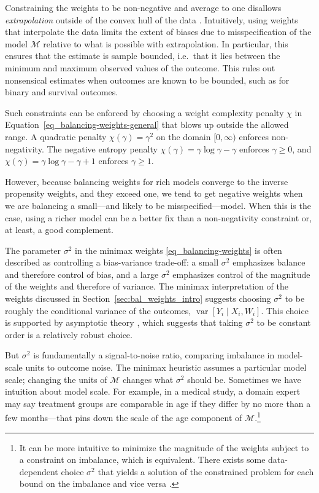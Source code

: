 \documentclass{article}
\theoremstyle{definition}
\DeclareMathOperator{\Var}{var}
\newcommand{\dispersion}{\chi}
\newcommand{\model}{\mathcal{M}}
\newcommand{\<}{\langle}
\renewcommand{\>}{\rangle}
\begin{document}
Constraining the weights to be non-negative and average to one disallows \emph{extrapolation} outside of the convex hull of the data \citep{hirshberg2025bregman}. Intuitively, using weights that interpolate the data limits the extent of biases due to misspecification of the model $\mathcal{M}$ relative to what is possible with extrapolation. In particular, this ensures that the estimate is sample bounded, i.e.\ that it lies between the minimum and maximum observed values of the outcome.
This rules out nonsensical estimates when outcomes are known to be bounded, such as for binary and survival outcomes.

Such constraints can be enforced by choosing a weight complexity penalty $\dispersion$ in Equation~\ref{eq_balancing-weights-general} that blows up outside the allowed range. A quadratic penalty $\dispersion(\gamma) = \gamma^2$ on the domain $[0, \infty)$ enforces non-negativity. The negative entropy penalty $\dispersion(\gamma) = \gamma \log \gamma - \gamma$ enforces $\gamma \ge 0$, and $\dispersion(\gamma) = \gamma \log \gamma - \gamma + 1$ enforces $\gamma \ge 1$.

However, because balancing weights for rich models converge to the inverse propensity weights, and they exceed one, we tend to get negative weights when we are balancing a small---and likely to be misspecified---model.
When this is the case, using a richer model can be a better fix than a non-negativity constraint or, at least, a good complement.

The parameter $\sigma^2$ in the minimax weights \eqref{eq_balancing-weights} is often described as controlling a bias-variance trade-off: a small $\sigma^2$ emphasizes balance and therefore control of bias, and a large $\sigma^2$ emphasizes control of the magnitude of the weights and therefore of variance. The minimax interpretation of the weights discussed in Section~\ref{sec:bal_weights_intro} suggests choosing $\sigma^2$ to be roughly the conditional variance of the outcomes, $\Var[Y_i \mid X_i, W_i]$. This choice is supported by asymptotic theory \citep[e.g.,][]{hirshberg2021augmented, hirshberg2019minimax}, which suggests that taking $\sigma^2$ to be constant order is a relatively robust choice.

But $\sigma^2$ is fundamentally a signal-to-noise ratio, comparing imbalance in model-scale units to outcome noise. The minimax heuristic assumes a particular model scale; changing the units of $\model$ changes what $\sigma^2$ should be. Sometimes we have intuition about model scale. For example, in a medical study, a domain expert may say treatment groups are comparable in age if they differ by no more than a few months---that pins down the scale of the age component of $\model$.\footnote{It can be more intuitive to minimize the magnitude of the weights subject to a constraint on imbalance, which is equivalent. There exists some data-dependent choice $\sigma^2$ that yields a solution of the constrained problem for each bound on the imbalance and vice versa \citep[Chapter 5]{boyd2004convex}.}
\end{document}
